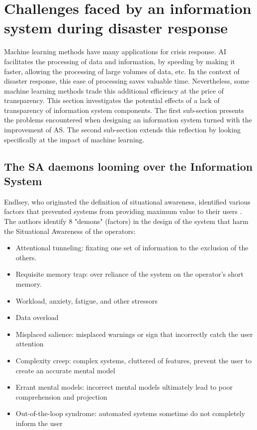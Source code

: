 \section{Challenges faced by an information system during disaster response}
Machine learning methods have many applications for crisis response.
AI facilitates the processing of data and information, by speeding by making it faster, allowing the processing of large volumes of data, etc.
In the context of disaster response, this ease of processing saves valuable time.
Nevertheless, some machine learning methods trade this additional efficiency at the price of transparency.
This section investigates the potential effects of a lack of transparency of information system components.
The first sub-section presents the problems encountered when designing an information system turned with the improvement of AS.
The second sub-section extends this reflection by looking specifically at the impact of machine learning.

\subsection{The SA daemons looming over the Information System}
Endlsey, who originated the definition of situational awareness, identified various factors that prevented systems from providing maximum value to their users \parencite{endsleyDesigningSituationAwareness2016}.
The authors identify 8 "demons" (factors) in the design of the system that harm the Situational Awareness of the operators:

\begin{itemize}
    \item Attentional tunneling: fixating one set of information to the exclusion of the others.
    \item Requisite memory trap: over reliance of the system on the operator's short memory.
    \item Workload, anxiety, fatigue, and other stressors
    \item Data overload
    \item Misplaced salience: misplaced warnings or sign that incorrectly catch the user attention
    \item Complexity creep: complex systems, cluttered of features, prevent the user to create an accurate mental model
    \item Errant mental models: incorrect mental models ultimately lead to poor comprehension and projection
    \item Out-of-the-loop syndrome: automated systems sometime do not completely inform the user
\end{itemize}

